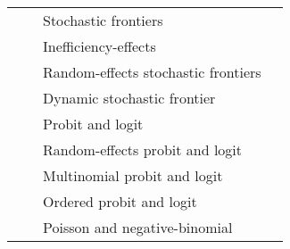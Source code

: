 \begin{table}[!ht]
{{\begin{tabular}{|l|l|l|c|}
                                                                 &                                              & Stochastic frontiers                                                  &                                                                     \\
                                                                 &                                              & Inefficiency-effects                                                  &                                                                     \\
                                                                 &                                              & Random-effects stochastic frontiers                                          &                                                                     \\
                                                                 &                                              & Dynamic stochastic frontier                 &                                                                     \\
                                                                 &                                              & Probit and logit                                                &                                                                     \\
                                                                 &                                              & Random-effects probit and logit                                       &                                                                     \\
                                                                 &                                              & Multinomial probit and logit                           &                                                                     \\
                                                                 &                                              & Ordered probit and logit                                        &                                                                     \\
                                                                 &                                              & Poisson and negative-binomial                                   &                                                                     \\

\end{tabular}}}
\end{table}
